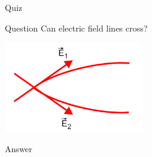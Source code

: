 %
%

{
\problemslide

\begin{frame}{Quiz}

\begin{blockexmplque}{Question}
  Can electric field lines cross?\\
   \vspace{0.3cm}
   \begin{center}
     \includegraphics[width=0.45\textwidth]{./images/problems/lect1_impossible_crossing_field_lines.png}\\
   \end{center}
\end{blockexmplque}

\begin{blockexmplans}{Answer}
\noindent
\end{blockexmplans}

\end{frame}

} %


%
%

